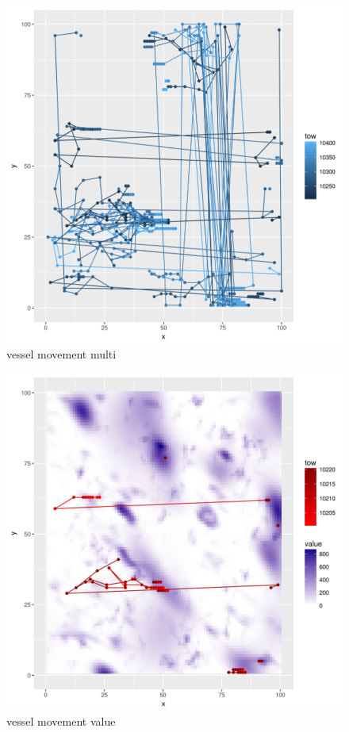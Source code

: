 \documentclass[review]{elsarticle}
\begin{document}
\begin{figure}[!ht]
	\includegraphics[width = \linewidth]{../tests/plots/vessel_multi_move}
	\caption{vessel movement multi}
	\label{fig:5}
\end{figure}	

\begin{figure}[!ht]
	\includegraphics[width = \linewidth]{../tests/plots/vessel_move_value}
	\caption{vessel movement value}
	\label{fig:6}
\end{figure}	
\end{document}
